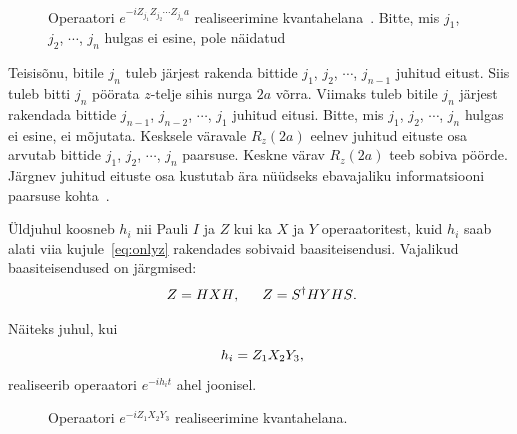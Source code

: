 \documentclass[12pt]{report}
\begin{document}
\begin{figure}[h]
  \centering
  \ifdefined\yquanton
  \fi
  \caption{Operaatori \(e^{-iZ_{j_1}Z_{j_2}\cdots Z_{j_n}a}\) realiseerimine kvantahelana~\cite{mansky+etal, nielsen+chuang}. Bitte, mis \(j_1\), \(j_2\), \(\cdots\), \(j_n\) hulgas ei esine, pole näidatud}
  \label{f:expz}
\end{figure}
Teisisõnu, bitile \(j_n\) tuleb järjest rakenda bittide \(j_1\), \(j_2\), \(\cdots\), \(j_{n-1}\) juhitud eitust.
Siis tuleb bitti \(j_n\) pöörata \(z\)-telje sihis nurga \(2a\) võrra.
Viimaks tuleb bitile \(j_n\) järjest rakendada bittide \(j_{n-1}\), \(j_{n-2}\), \(\cdots\), \(j_1\) juhitud eitusi.
Bitte, mis \(j_1\), \(j_2\), \(\cdots\), \(j_n\) hulgas ei esine, ei mõjutata.
Kesksele väravale \(R_z(2a)\) eelnev juhitud eituste osa arvutab bittide \(j_1\), \(j_2\), \(\cdots\), \(j_n\) paarsuse.
Keskne värav \(R_z(2a)\) teeb sobiva pöörde.
Järgnev juhitud eituste osa kustutab ära nüüdseks ebavajaliku informatsiooni paarsuse kohta~\cite{nielsen+chuang}.

Üldjuhul koosneb \(h_i\) nii Pauli \(I\) ja \(Z\) kui ka \(X\) ja \(Y\) operaatoritest, kuid \(h_i\) saab alati viia kujule~\eqref{eq:onlyz} rakendades sobivaid baasiteisendusi.
Vajalikud baasiteisendused on järgmised:
\begin{align}
    Z = HXH \rlap{,}\qquad Z = S^\dagger HYHS \rlap{.}
\end{align}

Näiteks juhul, kui
\begin{equation}
  h_i = Z_1X_2Y_3 \rlap{,}
\end{equation}
realiseerib operaatori \(e^{-i h_i t}\) ahel joonisel.

\begin{figure}[h]
  \centering
  \ifdefined\yquanton
  \fi
  \caption{Operaatori \(e^{-iZ_1X_2Y_3}\) realiseerimine kvantahelana.}
  \label{f:zxyex}
\end{figure}
\end{document}
